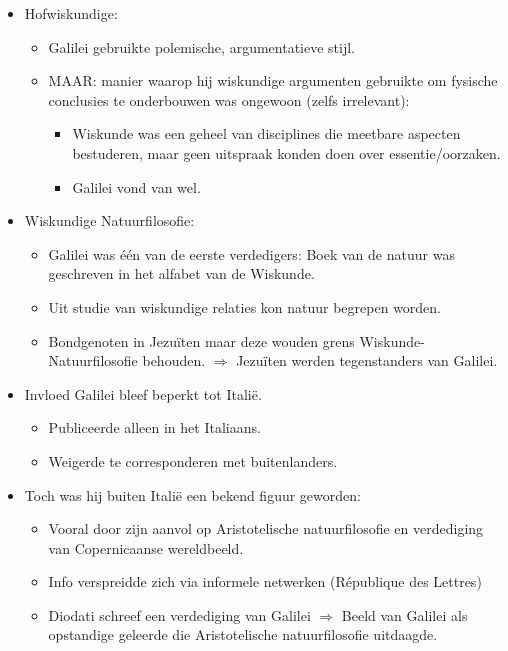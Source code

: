 \documentclass{article}
\begin{document}
\begin{itemize}
      \item Hofwiskundige:
      \begin{itemize}
        \item Galilei gebruikte polemische, argumentatieve stijl.
        \item MAAR: manier waarop hij wiskundige argumenten gebruikte om fysische conclusies te onderbouwen was ongewoon (zelfs irrelevant):
        \begin{itemize}
          \item Wiskunde was een geheel van disciplines die meetbare aspecten bestuderen, maar geen uitspraak konden doen over essentie/oorzaken.
          \item Galilei vond van wel.
        \end{itemize}
      \end{itemize}
      \item Wiskundige Natuurfilosofie:
      \begin{itemize}
        \item Galilei was \'e\'en van de eerste verdedigers: Boek van de natuur was geschreven in het alfabet van de Wiskunde.
        \item Uit studie van wiskundige relaties kon natuur begrepen worden.
        \item Bondgenoten in Jezu\"iten maar deze wouden grens Wiskunde-Natuurfilosofie behouden. $\Rightarrow$ Jezu\"iten werden tegenstanders van Galilei.
      \end{itemize}
      \item Invloed Galilei bleef beperkt tot Itali\"e.
      \begin{itemize}
        \item Publiceerde alleen in het Italiaans.
        \item Weigerde te corresponderen met buitenlanders.
      \end{itemize}
      \item Toch was hij buiten Itali\"e een bekend figuur geworden:
      \begin{itemize}
        \item Vooral door zijn aanvol op Aristotelische natuurfilosofie en verdediging van Copernicaanse wereldbeeld.
        \item Info verspreidde zich via informele netwerken (R\'epublique des Lettres)
        \item Diodati schreef een verdediging van Galilei $\Rightarrow$ Beeld van Galilei als opstandige geleerde die Aristotelische natuurfilosofie uitdaagde.

\end{itemize}
\end{itemize}
\end{document}
